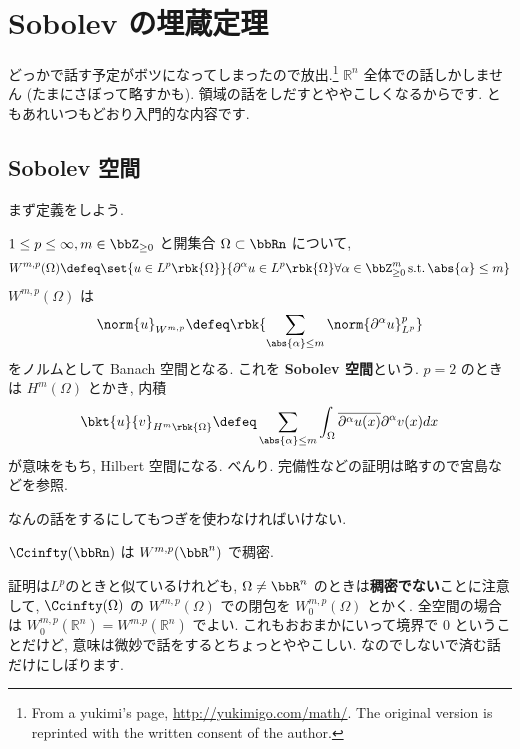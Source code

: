 \documentclass[openany, a4paper, oneside]{jsbook}
\begin{document}
\chapter{Sobolev の埋蔵定理}

どっかで話す予定がボツになってしまったので放出.\footnote{From a yukimi's page, \url{http://yukimigo.com/math/}.
The original version is reprinted with the written consent of the author.}
$\mathbb{R}^n$ 全体での話しかしません (たまにさぼって略すかも).
領域の話をしだすとややこしくなるからです.
ともあれいつもどおり入門的な内容です.
\section{Sobolev 空間}

まず定義をしよう.
\begin{defn}[Sobolev 空間]
 $1 \le p \le \infty, m \in \bbZ_{\ge 0}$
 と開集合 $\Omega \subset \bbRn$ について,
 \begin{align}
  W^{m, p}(\Omega)
  \defeq
  \set{u \in L^p \rbk{\Omega}}{\partial^{\alpha} u \in L^p \rbk{\Omega} \forall \alpha \in \bbZ_{\geq 0}^{m}\, \text{s.t.} \, \abs{\alpha} \le m }
 \end{align}
 $W^{m, p}(\Omega)$ は
 \begin{align}
  \norm{u}_{W^{m,p}}
  \defeq
  \rbk{\sum_{\abs{\alpha} \le m} \norm{\partial^{\alpha} u}_{L^p}^p}
 \end{align}
 をノルムとして Banach 空間となる.
 これを \textbf{Sobolev 空間}という.
 $p = 2$ のときは $H^m (\Omega)$ とかき, 内積
 \begin{align}
  \bkt{u}{v}_{H^m \rbk{\Omega}}
  \defeq
  \sum_{\abs{\alpha} \leq m}
  \int_{\Omega} \overline{\partial^{\alpha}u (x)} \partial^{\alpha}v (x) dx
 \end{align}
 が意味をもち, Hilbert 空間になる.
 べんり.
 完備性などの証明は略すので宮島\cite{ShizuoMiyajima1}などを参照.
\end{defn}
なんの話をするにしてもつぎを使わなければいけない.
\begin{thm}[Density]
 $\Ccinfty(\bbRn)$ は $W^{m, p}(\bbR^n)$ で稠密.
\end{thm}
\begin{rem}
 証明は$L^p$のときと似ているけれども, $\Omega \neq \bbR^n$ のときは\textbf{稠密でない}ことに注意して,
 $\Ccinfty (\Omega)$ の $W^{m, p}(\Omega)$ での閉包を $W_0^{m, p}(\Omega)$ とかく.
 全空間の場合は $W_0^{m, p}(\mathbb{R}^n) = W^{m. p}(\mathbb{R}^n)$ でよい.
 これもおおまかにいって境界で $0$ ということだけど, 意味は微妙で話をするとちょっとややこしい.
 なのでしないで済む話だけにしぼります.
\end{rem}
\end{document}
